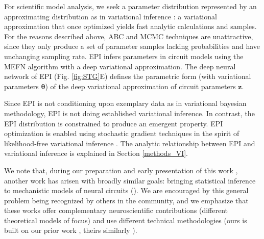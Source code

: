 \documentclass[11pt]{article}
\begin{document}
For scientific model analysis, we seek a parameter distribution represented by an approximating distribution as in variational inference \cite{saul1998mean}: a variational approximation that once optimized yields fast analytic calculations and samples.
For the reasons described above, ABC and MCMC techniques are unattractive, since they only produce a set of parameter samples lacking probabilities and have unchanging sampling rate.
EPI infers parameters in circuit models using the MEFN \cite{loaiza2017maximum} algorithm with a deep variational approximation.
The deep neural network of EPI (Fig. \ref{fig:STG}E) defines the parametric form (with variational parameters $\bm{\theta}$) of the deep variational approximation of circuit parameters $\mathbf{z}$.

Since EPI is not conditioning upon exemplary data as in variational bayesian methodology, EPI is not doing established variational inference.
In contrast, the EPI distribution is constrained to produce an emergent property.
EPI optimization is enabled using stochastic gradient techniques in the spirit of likelihood-free variational inference \cite{tran2017hierarchical}.
The analytic relationship between EPI and variational inference is explained in Section \ref{methods_VI}.

 We note that, during our preparation and early presentation of this work \cite{bittner2019degenerate, bittner2019examining}, another work has arisen with broadly similar goals: bringing statistical inference to mechanistic models of neural circuits (\cite{nonnenmacher2018sbi, desitler2019statistical, gonccalves2019training}).%
We are encouraged by this general problem being recognized by others in the community, and we emphasize that these works offer complementary neuroscientific contributions (different theoretical models of focus) and use different technical methodologies (ours is built on our prior work \cite{loaiza2017maximum}, theirs similarly \cite{LueckmannGoncalves_17}).
\end{document}
